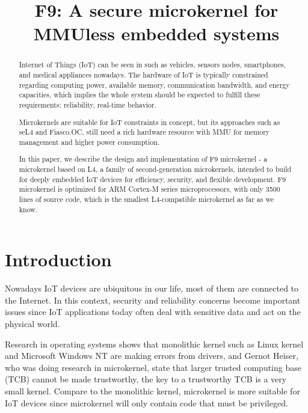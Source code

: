 \documentclass[10pt,preprint,nocopyrightspace]{sigplanconf}
\date{}
\begin{document}
\title{F9: A secure microkernel for MMUless embedded systems}
\maketitle



\begin{abstract}\textsl{}
	
Internet of Things (IoT) can be seen in such as vehicles, sensors nodes, smartphones, and medical appliances nowadays. The hardware of IoT is typically constrained regarding computing power, available memory, communication bandwidth, and energy capacities, which implies the whole system should be expected to fulfill these requirements: reliability, real-time behavior.

Microkernels are suitable for IoT constraints in concept, but its approaches such as seL4 and Fiasco.OC, still need a rich hardware resource with MMU for memory management and higher power consumption.

In this paper, we describe the design and implementation of F9 microkernel - a microkernel based on L4, a family of second-generation microkernels, intended to build for deeply embedded IoT devices for efficiency, security, and flexible development. F9 microkernel is optimized for ARM Cortex-M series microprocessors, with only 3500 lines of source code, which is the smallest L4-compatible microkernel as far as we know.

\end{abstract}

\section{Introduction}

Nowadays IoT devices are ubiquitous in our life, most of them are connected to the Internet. In this context, security and reliability concerns become important issues since IoT applications today often deal with sensitive data and act on the physical world.

Research in operating systems shows that monolithic kernel such as Linux kernel\cite{chou2001empirical} and Microsoft Windows NT\cite{swift2005improving} are making errors from drivers, and Gernot Heiser, who was doing research in microkernel, state that larger trusted computing base (TCB) cannot be made trustworthy, the key to a trustworthy TCB is a very small kernel. Compare to the monolithic kernel, microkernel is more suitable for IoT devices since microkernel will only contain code that must be privileged\cite{heiser2005secure}.
\end{document}
